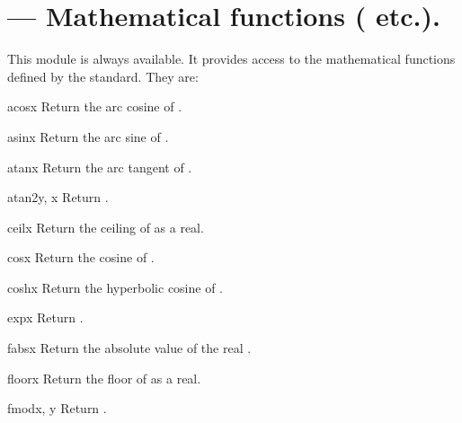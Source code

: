\section{ ---
         Mathematical functions ( etc.).}



This module is always available.
It provides access to the mathematical functions defined by the \C{}
standard.
They are:

\begin{funcdesc}{acos}{x}
Return the arc cosine of .
\end{funcdesc}

\begin{funcdesc}{asin}{x}
Return the arc sine of .
\end{funcdesc}

\begin{funcdesc}{atan}{x}
Return the arc tangent of .
\end{funcdesc}

\begin{funcdesc}{atan2}{y, x}
Return .
\end{funcdesc}

\begin{funcdesc}{ceil}{x}
Return the ceiling of  as a real.
\end{funcdesc}

\begin{funcdesc}{cos}{x}
Return the cosine of .
\end{funcdesc}

\begin{funcdesc}{cosh}{x}
Return the hyperbolic cosine of .
\end{funcdesc}

\begin{funcdesc}{exp}{x}
Return .
\end{funcdesc}

\begin{funcdesc}{fabs}{x}
Return the absolute value of the real .
\end{funcdesc}

\begin{funcdesc}{floor}{x}
Return the floor of  as a real.
\end{funcdesc}

\begin{funcdesc}{fmod}{x, y}
Return .
\end{funcdesc}

